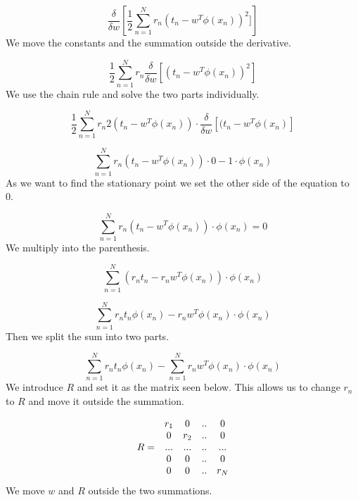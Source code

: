 \documentclass{article}
\begin{document}
\begin{equation*}
  \frac{\delta}{\delta w} \left[ \frac{1}{2}\sum_{n=1}^{N} r_n(t_n -w^T\phi(x_n))^2 ] \right] 
\end{equation*}
We move the constants and the summation outside the derivative.

\begin{equation*}
  \frac{1}{2}\sum_{n=1}^{N} r_n \frac{\delta}{\delta w} \left[ (t_n - w^T\phi(x_n))^2 \right]
\end{equation*}
We use the chain rule and solve the two parts individually.

\begin{equation*}
    \frac{1}{2}\sum_{n=1}^{N} r_n 2(t_n - w^T\phi(x_n)) \cdot \frac{\delta}{\delta w} \left[ (t_n - w^T\phi(x_n) \right]
\end{equation*}

\begin{equation*}
    \sum_{n=1}^{N} r_n (t_n - w^T\phi(x_n)) \cdot 0 - 1 \cdot \phi(x_n)
\end{equation*}
As we want to find the stationary point we set the other side of the
equation to 0.

\begin{equation*}
    \sum_{n=1}^{N} r_n (t_n - w^T\phi(x_n)) \cdot \phi(x_n) = 0
\end{equation*}
We multiply into the parenthesis.

\begin{equation*}
    \sum_{n=1}^{N} (r_n t_n - r_n w^T\phi(x_n)) \cdot \phi(x_n)
\end{equation*}

\begin{equation*}
    \sum_{n=1}^{N} r_n t_n \phi(x_n) - r_n w^T\phi(x_n) \cdot \phi(x_n)
\end{equation*}
Then we split the sum into two parts. 

\begin{equation*}
    \sum_{n=1}^{N} r_n t_n \phi(x_n) - \sum_{n=1}^{N} r_n w^T\phi(x_n) \cdot \phi(x_n)
\end{equation*}
We introduce $R$ and set it as the matrix seen below. This allows us to
change $r_n$ to $R$ and move it outside the summation.

\begin{equation*}
    \begin{array}{r c c c c}
    &   r_1 & 0   & .. & 0   \\
    &   0   & r_2 & .. & 0   \\
  R =   &  ...  & ... & .. & ...   \\
    &   0   & 0   & .. & 0   \\
    &   0   & 0   & .. & r_N 
    \end{array}
\end{equation*}
We move $w$ and $R$ outside the two summations.
\end{document}
